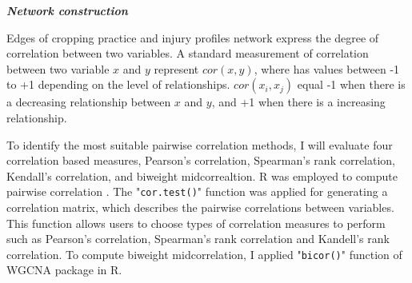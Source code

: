 


\textit{\textbf{Network construction}}



Edges of cropping practice and injury profiles network express the degree of correlation between two variables. A standard measurement of correlation between two variable $x$ and $y$ represent $cor(x,y)$, where has values between -1 to +1 depending on the level of relationships. $cor(x_{i}, x_{j})$ equal -1 when there is a decreasing relationship between $x$ and $y$, and +1 when there is a increasing relationship.

To identify the most suitable pairwise correlation methods, I will evaluate four correlation based measures, Pearson's correlation, Spearman's rank correlation, Kendall's correlation, and biweight midcorrealtion. R was employed to compute pairwise correlation . The "\texttt{cor.test()}" function was applied for generating a correlation matrix, which describes the pairwise correlations between variables. This function allows users to choose types of correlation measures to perform such as Pearson's correlation, Spearman's rank correlation and Kandell's rank correlation. To compute biweight midcorrelation, I applied "\texttt{bicor()}" function of WGCNA package  in R. 

